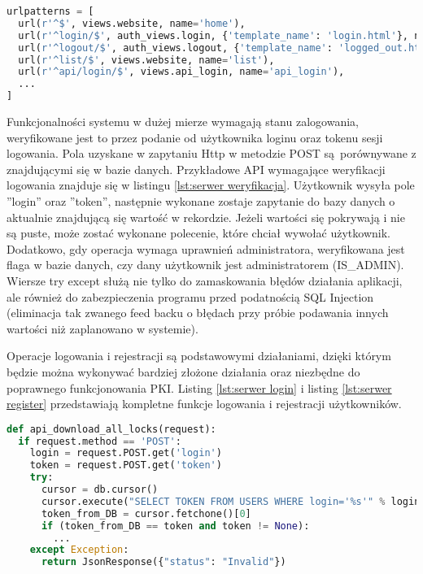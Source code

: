 {\footnotesize 
\begin{lstlisting}[caption={Fragment pliku urls.py}, label={lst:python url}, language=Python]
urlpatterns = [
  url(r'^$', views.website, name='home'),
  url(r'^login/$', auth_views.login, {'template_name': 'login.html'}, name='login'),
  url(r'^logout/$', auth_views.logout, {'template_name': 'logged_out.html'}, name='logout'),
  url(r'^list/$', views.website, name='list'),
  url(r'^api/login/$', views.api_login, name='api_login'),
  ...
]
\end{lstlisting}}

	Funkcjonalności systemu w  dużej mierze wymagają stanu zalogowania, weryfikowane jest to przez podanie od użytkownika loginu oraz tokenu sesji logowania. Pola uzyskane w zapytaniu Http w metodzie POST są~porównywane z znajdującymi się w bazie danych. Przykładowe API wymagające weryfikacji logowania znajduje się w listingu \ref{lst:serwer weryfikacja}. Użytkownik wysyła pole ''login'' oraz ''token'', następnie wykonane zostaje zapytanie do bazy danych o aktualnie znajdującą się wartość w rekordzie. Jeżeli wartości się pokrywają i nie są puste, może zostać wykonane polecenie, które chciał wywołać użytkownik. Dodatkowo, gdy operacja wymaga uprawnień administratora, weryfikowana jest flaga w bazie danych, czy dany użytkownik jest administratorem (IS\_ADMIN). Wiersze try except służą nie tylko do zamaskowania błędów działania aplikacji, ale również do zabezpieczenia programu przed podatnością SQL Injection (eliminacja tak zwanego feed backu o błędach przy próbie podawania innych wartości niż zaplanowano w systemie).
	
	Operacje logowania i rejestracji są podstawowymi działaniami, dzięki którym będzie można wykonywać bardziej złożone działania oraz niezbędne do poprawnego funkcjonowania PKI. Listing \ref{lst:serwer login} i listing \ref{lst:serwer register} przedstawiają kompletne funkcje logowania i rejestracji użytkowników. 

	{\footnotesize 
	\begin{lstlisting}[caption={Przykładowe API weryfikujące stan logowania}, label={lst:serwer weryfikacja}, language=Python]
def api_download_all_locks(request):
  if request.method == 'POST':
    login = request.POST.get('login')
    token = request.POST.get('token')
    try:
      cursor = db.cursor()
      cursor.execute("SELECT TOKEN FROM USERS WHERE login='%s'" % login)
      token_from_DB = cursor.fetchone()[0]
      if (token_from_DB == token and token != None):
        ...
    except Exception:
      return JsonResponse({"status": "Invalid"})
	\end{lstlisting}}

